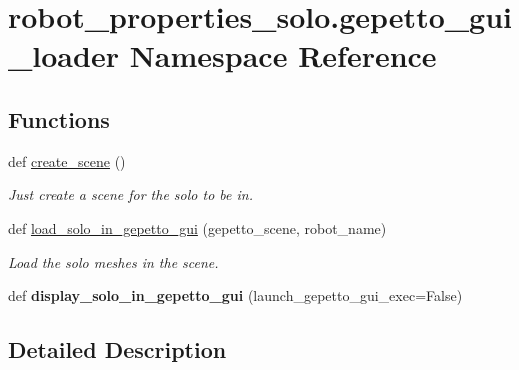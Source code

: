 \hypertarget{namespacerobot__properties__solo_1_1gepetto__gui__loader}{}\section{robot\+\_\+properties\+\_\+solo.\+gepetto\+\_\+gui\+\_\+loader Namespace Reference}
\label{namespacerobot__properties__solo_1_1gepetto__gui__loader}
\subsection*{Functions}
\begin{DoxyCompactItemize}
\item 
\mbox{\label{namespacerobot__properties__solo_1_1gepetto__gui__loader_a552eee4251af98b68b22f20984ac8633}} 
def \hyperlink{namespacerobot__properties__solo_1_1gepetto__gui__loader_a552eee4251af98b68b22f20984ac8633}{create\+\_\+scene} ()
\begin{DoxyCompactList}\small\item\em Just create a scene for the solo to be in. \end{DoxyCompactList}\item 
\mbox{\label{namespacerobot__properties__solo_1_1gepetto__gui__loader_a7b944d6d04d91f7c56ead955046b7e93}} 
def \hyperlink{namespacerobot__properties__solo_1_1gepetto__gui__loader_a7b944d6d04d91f7c56ead955046b7e93}{load\+\_\+solo\+\_\+in\+\_\+gepetto\+\_\+gui} (gepetto\+\_\+scene, robot\+\_\+name)
\begin{DoxyCompactList}\small\item\em Load the solo meshes in the scene. \end{DoxyCompactList}\item 
\mbox{\label{namespacerobot__properties__solo_1_1gepetto__gui__loader_a337189b9a5afcb6de702c204cafbb9b7}} 
def {\bfseries display\+\_\+solo\+\_\+in\+\_\+gepetto\+\_\+gui} (launch\+\_\+gepetto\+\_\+gui\+\_\+exec=False)
\end{DoxyCompactItemize}


\subsection{Detailed Description}
\begin{DoxyVerb}\end{DoxyVerb}
 